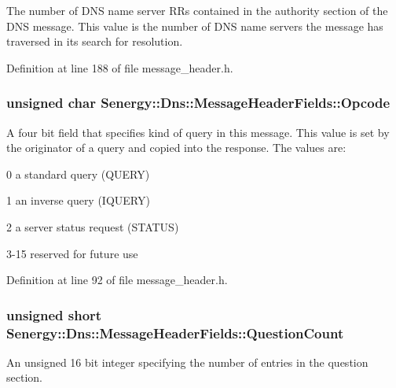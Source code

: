 The number of D\-N\-S name server R\-Rs contained in the authority section of the D\-N\-S message. This value is the number of D\-N\-S name servers the message has traversed in its search for resolution. 



Definition at line 188 of file message\-\_\-header.\-h.

\hypertarget{struct_senergy_1_1_dns_1_1_message_header_fields_ac2d7ba4468405e5693f07d4321058be0}{
\subsubsection[{Opcode}]{\setlength{\rightskip}{0pt plus 5cm}unsigned char Senergy\-::\-Dns\-::\-Message\-Header\-Fields\-::\-Opcode}}\label{struct_senergy_1_1_dns_1_1_message_header_fields_ac2d7ba4468405e5693f07d4321058be0}


A four bit field that specifies kind of query in this message. This value is set by the originator of a query and copied into the response. The values are\-: 

0 a standard query (Q\-U\-E\-R\-Y)

1 an inverse query (I\-Q\-U\-E\-R\-Y)

2 a server status request (S\-T\-A\-T\-U\-S)

3-\/15 reserved for future use 

Definition at line 92 of file message\-\_\-header.\-h.

\hypertarget{struct_senergy_1_1_dns_1_1_message_header_fields_a8af9bbfa134c9e0d4fc846103f7b72ad}{
\subsubsection[{Question\-Count}]{\setlength{\rightskip}{0pt plus 5cm}unsigned short Senergy\-::\-Dns\-::\-Message\-Header\-Fields\-::\-Question\-Count}}\label{struct_senergy_1_1_dns_1_1_message_header_fields_a8af9bbfa134c9e0d4fc846103f7b72ad}


An unsigned 16 bit integer specifying the number of entries in the question section. 



